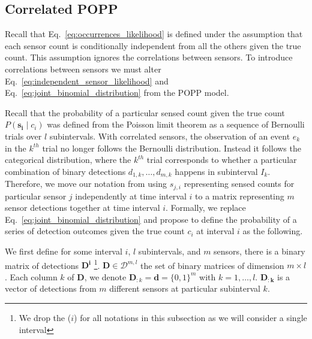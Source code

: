 
\subsection{Correlated POPP}
\label{subsec:cpop}

Recall that Eq.~\ref{eq:occurrences_likelihood} is defined under the assumption that each sensor count is conditionally independent from all the others given the true count. This assumption ignores the correlations between sensors. 
% 
To introduce correlations between sensors we must alter Eq.~\ref{eq:independent_sensor_likelihood} and
Eq.~\ref{eq:joint_binomial_distribution} from the POPP model.


Recall that the probability of a particular sensed count given the true count $P(\mathbf{s_i} \mid c_i)$ was defined from the Poisson limit theorem as a sequence of Bernoulli trials over $l$ subintervals. With correlated sensors, the observation of an event $e_k$ in the $k^{th}$ trial no longer follows the Bernoulli distribution. Instead it follows the categorical distribution, where the $k^{th}$ trial corresponds to whether a particular combination of binary detections $d_{1,k}, \ldots, d_{m,k}$ happens in subinterval $I_k$. Therefore, we move our notation from using $s_{j, i}$ representing sensed counts for particular sensor $j$ independently at time interval $i$ to a matrix representing $m$ sensor detections together at time interval $i$. Formally, we replace Eq.~\ref{eq:joint_binomial_distribution} and propose to define the probability of a series of detection outcomes given the true count $c_i$ at interval $i$ as the following.

We first define for some interval $i$, $l$ subintervals, and $m$ sensors, there is a binary matrix of detections $\mathbf{D^i}$ \footnote{We drop the ($i$) for all notations in this subsection as we will consider a single interval}. $\mathbf{D} \in \mathcal{D}^{m , l}$ the set of binary matrices of dimension $m \times l$. Each column $k$ of $\mathbf{D}$, we denote $\mathbf{D}_{:k} = \mathbf{d} = \{0, 1\}^m$ with $k = 1, \ldots, l$. $\mathbf{D_{:k}}$ is a vector of detections from $m$ different sensors at particular subinterval $k$. 

